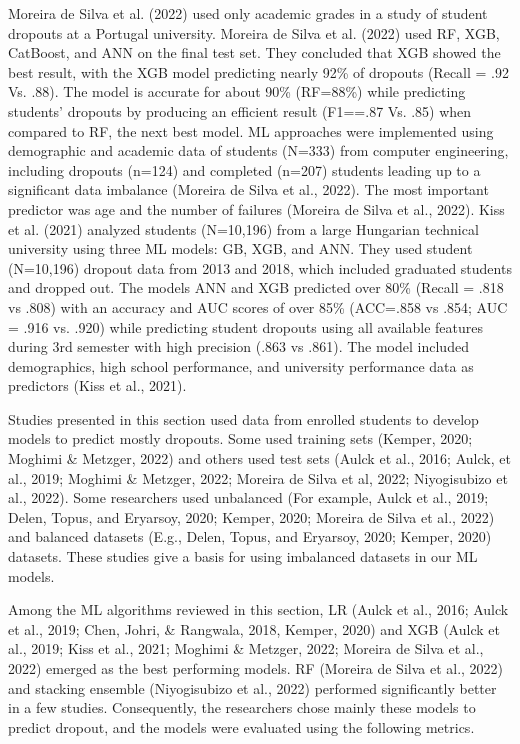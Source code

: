 \documentclass[notitlepage,12pt]{jedm}
\begin{document}
\par Moreira de Silva et al. (2022) used only academic grades in a study of student dropouts at a Portugal university.  Moreira de Silva et al. (2022) used RF, XGB, CatBoost, and ANN on the final test set. They concluded that XGB showed the best result, with the XGB model predicting nearly 92\% of dropouts (Recall = .92 Vs. .88).  The model is accurate for about 90\% (RF=88\%) while predicting students’ dropouts by producing an efficient result (F1==.87 Vs. .85) when compared to RF, the next best model. ML approaches were implemented using demographic and academic data of students (N=333) from computer engineering, including dropouts (n=124) and completed (n=207) students leading up to a significant data imbalance (Moreira de Silva et al., 2022).  The most important predictor was age and the number of failures (Moreira de Silva et al., 2022).  Kiss et al. (2021) analyzed students (N=10,196) from a large Hungarian technical university using three ML models: GB, XGB, and ANN. They used student (N=10,196) dropout data from 2013 and 2018, which included graduated students and dropped out.  The models ANN and XGB predicted over 80\% (Recall = .818 vs .808) with an accuracy and AUC scores of over 85\% (ACC=.858 vs .854; AUC = .916 vs. .920) while predicting student dropouts using all available features during 3rd semester with high precision (.863 vs .861).  The model included demographics, high school performance, and university performance data as predictors (Kiss et al., 2021).  

\par Studies presented in this section used data from enrolled students to develop models to predict mostly dropouts.  Some used training sets (Kemper, 2020; Moghimi \& Metzger, 2022) and others used test sets (Aulck et al., 2016; Aulck, et al., 2019; Moghimi \& Metzger, 2022; Moreira de Silva et al, 2022; Niyogisubizo et al., 2022).  Some researchers used unbalanced (For example, Aulck et al., 2019; Delen, Topus, and Eryarsoy, 2020; Kemper, 2020; Moreira de Silva et al., 2022) and balanced datasets (E.g., Delen, Topus, and Eryarsoy, 2020; Kemper, 2020) datasets.  These studies give a basis for using imbalanced datasets in our ML models.   

\par Among the ML algorithms reviewed in this section, LR (Aulck et al., 2016; Aulck et al., 2019; Chen, Johri, \& Rangwala, 2018, Kemper, 2020) and XGB (Aulck et al., 2019; Kiss et al., 2021; Moghimi \& Metzger, 2022; Moreira de Silva et al., 2022) emerged as the best performing models.  RF (Moreira de Silva et al., 2022) and stacking ensemble (Niyogisubizo et al., 2022) performed significantly better in a few studies.  Consequently, the researchers chose mainly these models to predict dropout, and the models were evaluated using the following metrics.    
\end{document}
